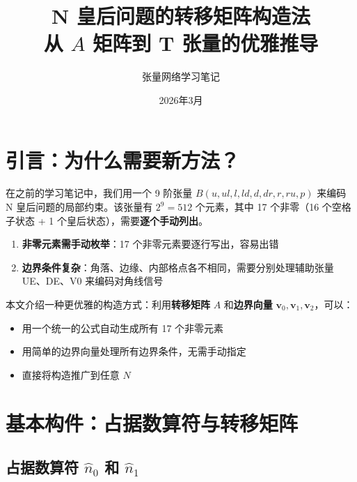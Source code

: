 \documentclass[12pt,a4paper]{article}
\title{\Huge\textbf{N 皇后问题的转移矩阵构造法} \\ \Large 从 $A$ 矩阵到 T 张量的优雅推导}
\author{张量网络学习笔记}
\date{2026年3月}
\begin{document}
\maketitle
\tableofcontents
\newpage

\section{引言：为什么需要新方法？}

在之前的学习笔记中，我们用一个 9 阶张量 $B(u, ul, l, ld, d, dr, r, ru, p)$ 来编码 N 皇后问题的局部约束。该张量有 $2^9 = 512$ 个元素，其中 17 个非零（16 个空格子状态 + 1 个皇后状态），需要\textbf{逐个手动列出}。

\begin{warnbox}[旧方法的两个痛点]
\begin{enumerate}
  \item \textbf{非零元素需手动枚举}：17 个非零元素要逐行写出，容易出错
  \item \textbf{边界条件复杂}：角落、边缘、内部格点各不相同，需要分别处理辅助张量 UE、DE、V0 来编码对角线信号
\end{enumerate}
\end{warnbox}

本文介绍一种更优雅的构造方式：利用\textbf{转移矩阵} $A$ 和\textbf{边界向量} $\mathbf{v}_0, \mathbf{v}_1, \mathbf{v}_2$，可以：
\begin{itemize}
  \item 用一个统一的公式自动生成所有 17 个非零元素
  \item 用简单的边界向量处理所有边界条件，无需手动指定
  \item 直接将构造推广到任意 $N$
\end{itemize}

\section{基本构件：占据数算符与转移矩阵}

\subsection{占据数算符 $\hat{n}_0$ 和 $\hat{n}_1$}
\end{document}
